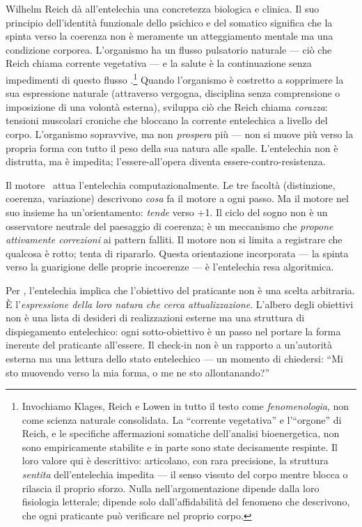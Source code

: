 Wilhelm Reich d\`a all'entelechia una concretezza biologica e clinica.
Il suo principio dell'identit\`a funzionale dello psichico e del somatico
significa che la spinta verso la coerenza non \`e meramente un atteggiamento
mentale ma una condizione corporea. L'organismo ha un flusso pulsatorio
naturale --- ci\`o che Reich chiama corrente vegetativa --- e la salute
\`e la continuazione senza impedimenti di questo flusso
\parencite{reich1933character}.\footnote{Invochiamo Klages, Reich e Lowen
in tutto il testo come \emph{fenomenologia}, non come scienza naturale
consolidata. La ``corrente vegetativa'' e l'``orgone'' di Reich, e le specifiche
affermazioni somatiche dell'analisi bioenergetica, non sono empiricamente
stabilite e in parte sono state decisamente respinte. Il loro valore qui \`e
descrittivo: articolano, con rara precisione, la struttura \emph{sentita}
dell'entelechia impedita --- il senso vissuto del corpo mentre blocca o rilascia
il proprio sforzo. Nulla nell'argomentazione dipende dalla loro fisiologia
letterale; dipende solo dall'affidabilit\`a del fenomeno che descrivono, che
ogni praticante pu\`o verificare nel proprio corpo.} Quando l'organismo \`e costretto a
sopprimere la sua espressione naturale (attraverso vergogna, disciplina
senza comprensione o imposizione di una volont\`a esterna), sviluppa
ci\`o che Reich chiama \emph{corazza}: tensioni muscolari croniche che
bloccano la corrente entelechica a livello del corpo. L'organismo
sopravvive, ma non \emph{prospera} pi\`u --- non si muove pi\`u verso
la propria forma con tutto il peso della sua natura alle spalle.
L'entelechia non \`e distrutta, ma \`e impedita; l'essere-all'opera
diventa essere-contro-resistenza.

Il motore \physis\ attua l'entelechia computazionalmente. Le tre
facolt\`a (distinzione, coerenza, variazione) descrivono \emph{cosa}
fa il motore a ogni passo. Ma il motore nel suo insieme ha
un'orientamento: \emph{tende} verso +1. Il ciclo del sogno non \`e un
osservatore neutrale del paesaggio di coerenza; \`e un meccanismo che
\emph{propone attivamente correzioni} ai pattern falliti. Il motore non
si limita a registrare che qualcosa \`e rotto; tenta di ripararlo.
Questa orientazione incorporata --- la spinta verso la guarigione delle
proprie incoerenze --- \`e l'entelechia resa algoritmica.

Per \praxis, l'entelechia implica che l'obiettivo del praticante non
\`e una scelta arbitraria. \`E l'\emph{espressione della loro natura
che cerca attualizzazione}. L'albero degli obiettivi non \`e una lista
di desideri di realizzazioni esterne ma una struttura di dispiegamento
entelechico: ogni sotto-obiettivo \`e un passo nel portare la forma
inerente del praticante all'essere. Il check-in non \`e un rapporto a
un'autorit\`a esterna ma una lettura dello stato entelechico --- un
momento di chiedersi: ``Mi sto muovendo verso la mia forma, o me ne
sto allontanando?''

